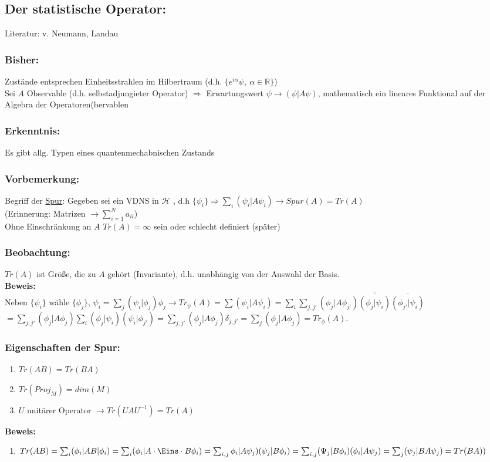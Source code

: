 \documentclass[twoside,a4paper]{scrartcl}
\newcommand{\R}{\mathbb{R}}
\renewcommand{\1}{\mathds{1}}
\newcommand{\Ra}{\Rightarrow}
\newcommand{\ra}{\rightarrow}
\renewcommand{\H}{\mathcal{H}}
\renewcommand{\R}{\mathbb{R}}
\begin{document}
\subsection{Der statistische Operator:}
Literatur: v. Neumann, Landau\\
\subsubsection*{Bisher:}
Zustände entsprechen Einheitsstrahlen im Hilbertraum (d.h. $\{e^{i\alpha}\psi, \ \alpha \in \R \}$)\\
Sei $A$ Observable (d.h. selbstadjungieter Operator) $\Ra$ Erwartungswert $\psi \ra (\psi|A\psi)$, mathematisch ein lineares Funktional auf der Algebra der Operatoren(bervablen
\subsubsection*{Erkenntnis:}
Es gibt allg. Typen eines quantenmechabnischen Zustands
\subsubsection*{Vorbemerkung:}
Begriff der \underline{Spur}: Gegeben sei ein VDNS in $\H$ , d.h $\{\psi_i\} \Ra \sum_i(\psi_i|A\psi_i) \ra Spur(A)=Tr(A)$\\
(Erinnerung: Matrizen $\ra \sum_{i=1}^N a_{ii}$)\\
Ohne Einschränkung an $A$ $Tr(A)=\infty$ sein oder schlecht definiert (später)
\subsubsection*{Beobachtung:}
$Tr(A)$ ist Größe, die zu $A$ gehört (Invariante), d.h. unabhängig von der Auswahl der Basis.\\
\textbf{Beweis:}\\
Neben $\{\psi_i\}$ wähle $\{\phi_j\}$, $\psi_i=\sum_j (\psi_i|\phi_j)\phi_j \ra Tr_\psi (A)=\sum (\psi_i|A\psi_i)=\sum_i \sum_{j,j'} (\phi_j|A\phi_{j'})\overline{\overline{(\phi_j|\psi_i)}}\overline{(\phi_{j'}|\psi_i)}$\\
$=\sum_{j,j'} (\phi_j|A\phi_j)\sum_i (\phi_j|\psi_i)(\psi_i|\phi_{j'})=\sum_{j,j'} (\phi_j|A\phi_j)\delta_{j,j'}=\sum_j(\phi_j|A\phi_j)=Tr_\phi(A).$
\subsubsection*{Eigenschaften der Spur:}
\begin{enumerate}
\item $Tr(AB)=Tr(BA)$
\item $Tr(Proj_M)=dim(M)$
\item $U$ unitärer Operator $\ra Tr(UAU^{-1})=Tr(A)$
\end{enumerate}
\textbf{Beweis:}
\begin{enumerate}
\item $Tr(AB)=\sum_{i}(\phi_i|AB|\phi_i)=\sum_i (\phi_i|A \cdot \Eins \cdot B \phi_i)=\sum_{i,j} \phi_i|A\psi_j)(\psi_j|B\phi_i)=\sum_{i,j} (\Psi_j|B\phi_i)(\phi_i|A\psi_j)=\sum_j (\psi_j|BA\psi_j)=Tr(BA))$
\end{enumerate}
\end{document}
